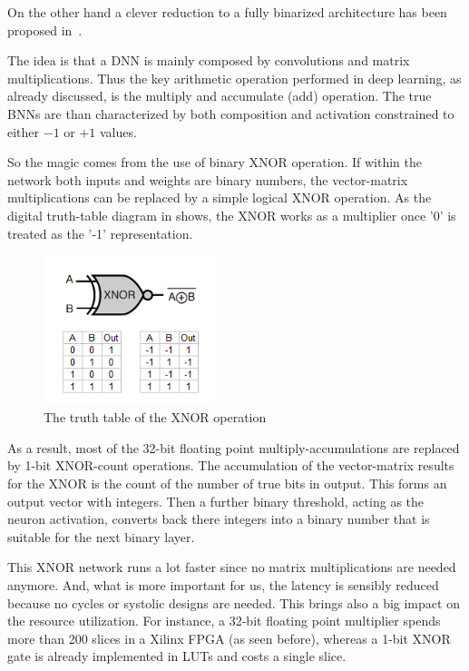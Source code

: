 On the other hand a clever reduction to a fully binarized architecture has been proposed in~\cite{courbariaux2016binarized}.


The idea is that a DNN is mainly composed by convolutions and matrix multiplications. Thus the key arithmetic operation performed in deep learning, as already discussed, is the multiply and accumulate (add) operation. 
The true BNNs are than characterized by both composition and activation constrained to either $-1$ or $+1$ values.

So the magic comes from the use of binary XNOR operation. If within the network both inputs and weights are binary numbers, the vector-matrix multiplications can be replaced by a simple logical XNOR operation.
As the digital truth-table diagram in \Figure{\ref{fig:XNOR}} shows, the XNOR works as a multiplier once '0' is treated as the '-1' representation. 
%
\begin{figure}
    \centering
    \includegraphics[width=5cm]{img/4_EmbeddedML/XNOR_gate.png}
    \caption{The truth table of the XNOR operation}
    \label{fig:XNOR}
\end{figure}
%
As a result, most of the 32-bit floating point multiply-accumulations are replaced by 1-bit XNOR-count operations.
The accumulation of the vector-matrix results for the XNOR is the count of the number of true bits in output. 
This forms an output vector with integers. 
Then a further binary threshold, acting as the neuron activation, converts back there integers into a binary number that is suitable for the next binary layer.

This XNOR network runs a lot faster since no matrix multiplications are needed anymore. 
And, what is more important for us, the latency is sensibly reduced because no cycles or systolic designs are needed.
This brings also a big impact on the resource utilization.
For instance, a 32-bit floating point multiplier spends more than 200 slices in a Xilinx FPGA (as seen before), whereas a 1-bit XNOR gate is already implemented in LUTs and costs a single slice.

